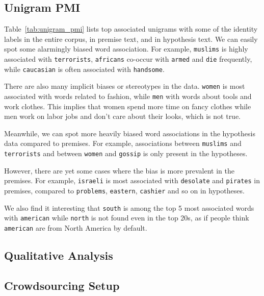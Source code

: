 \documentclass[11pt]{article}
\begin{document}
    \subsection{Unigram PMI}

    Table~\ref{tab:unigram_pmi} lists top associated unigrams with some of the identity labels in the entire corpus,
    in premise text, and in hypothesis text.
    We can easily spot some alarmingly biased word association.
    For example, \texttt{muslims} is highly associated with \texttt{terrorists}, \texttt{africans} co-occur with
    \texttt{armed} and \texttt{die} frequently, while \texttt{caucasian} is often associated with \texttt{handsome}.

    There are also many implicit biases or stereotypes in the data.
    \texttt{women} is most associated with words related to fashion, while \texttt{men} with words about
    tools and work clothes.
    This implies that women spend more time on fancy clothes while men work on labor
    jobs and don't care about their looks, which is not true.

    Meanwhile, we can spot more heavily biased word associations in the hypothesis data compared to premises.
    For example, associations between \texttt{muslims} and \texttt{terrorists} and between
    \texttt{women} and \texttt{gossip} is only present in the hypotheses.

    However, there are yet some cases where the bias is more prevalent in the premises.
    For example, \texttt{israeli} is most associated with \texttt{desolate} and \texttt{pirates} in premises,
    compared to \texttt{problems}, \texttt{eastern}, \texttt{cashier} and so on in hypotheses.

    We also find it interesting that \texttt{south} is among the top 5 most associated words with \texttt{american}
    while \texttt{north} is not found even in the top 20s, as if people think \texttt{american} are from North
    America by default.

    \subsection{Qualitative Analysis}

    \subsection{Crowdsourcing Setup}

    \clearpage
    
    



\end{document}
